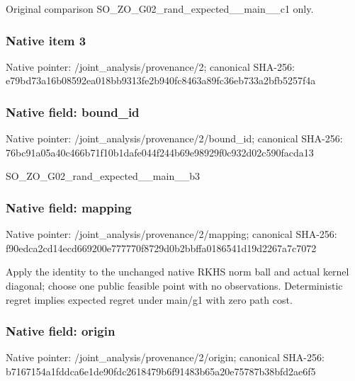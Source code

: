\documentclass[10pt,a4paper]{article}
\begin{document}
\begingroup\raggedright\sloppy Original comparison SO\_\allowbreak{}ZO\_\allowbreak{}G02\_\allowbreak{}rand\_\allowbreak{}expected\_\allowbreak{}\_\allowbreak{}main\_\allowbreak{}\_\allowbreak{}c1 only.\par\endgroup

\subsubsection{Native item 3}
Native pointer: /joint\_\allowbreak{}analysis/provenance/2; canonical SHA-256: e79bd73a16b08592ea018bb9313fe2b940fc8463a89fc36eb733a2bfb5257f4a

\subsubsection{Native field: bound\_\allowbreak{}id}
Native pointer: /joint\_\allowbreak{}analysis/provenance/2/bound\_\allowbreak{}id; canonical SHA-256: 76bc91a05a40c466b71f10b1dafe044f244b69e98929f0c932d02c590facda13

\begingroup\raggedright\sloppy SO\_\allowbreak{}ZO\_\allowbreak{}G02\_\allowbreak{}rand\_\allowbreak{}expected\_\allowbreak{}\_\allowbreak{}main\_\allowbreak{}\_\allowbreak{}b3\par\endgroup

\subsubsection{Native field: mapping}
Native pointer: /joint\_\allowbreak{}analysis/provenance/2/mapping; canonical SHA-256: f90edca2cd14ecd669200e777770f8729d0b2bbffa0186541d19d2267a7c7072

\begingroup\raggedright\sloppy Apply the identity to the unchanged native RKHS norm ball and actual kernel diagonal;\allowbreak{} choose one public feasible point with no observations. Deterministic regret implies expected regret under main/\allowbreak{}g1 with zero path cost.\par\endgroup

\subsubsection{Native field: origin}
Native pointer: /joint\_\allowbreak{}analysis/provenance/2/origin; canonical SHA-256: b7167154a1fddca6e1de90fdc2618479b6f91483b65a20e75787b38bfd2ae6f5
\end{document}
